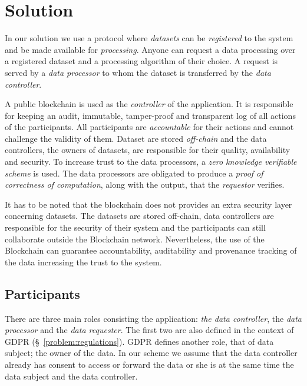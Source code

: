 \chapter{Solution}
\label{solution}

In our solution we use a protocol where \textit{datasets} can be \textit{registered} to the system and be made available for \textit{processing}. Anyone can request a data processing over a registered dataset and a processing algorithm of their choice. A request is served by a \textit{data processor} to whom the dataset is transferred by the \textit{data controller}.

A public blockchain is used as the \textit{controller} of the application. It is responsible for keeping an audit, immutable, tamper-proof and transparent log of all actions of the participants. All participants are \textit{accountable} for their actions and cannot challenge the validity of them. Dataset are stored \textit{off-chain} and the data controllers, the owners of datasets, are responsible for their quality, availability and security. To increase trust to the data processors, a \textit{zero knowledge verifiable scheme} is used. The data processors are obligated to produce a \textit{proof of correctness of computation}, along with the output, that the \textit{requestor} verifies.

It has to be noted that the blockchain does not provides an extra security layer concerning datasets. The datasets are stored off-chain, data controllers are responsible for the security of their system and the participants can still collaborate outside the Blockchain network. Nevertheless, the use of the Blockchain can guarantee accountability, auditability and provenance tracking of the data increasing the trust to the system.

\section{Participants}
\label{solution:entities}

There are three main roles consisting the application: \textit{the data controller}, the \textit{data processor} and the \textit{data requester}. The first two are also defined in the context of GDPR (§~\ref{problem:regulations}).
GDPR defines another role, that of data subject; the owner of the data.
In our scheme we assume that the data controller already has consent to access or forward the data or she is at the same time the data subject and the data controller.

